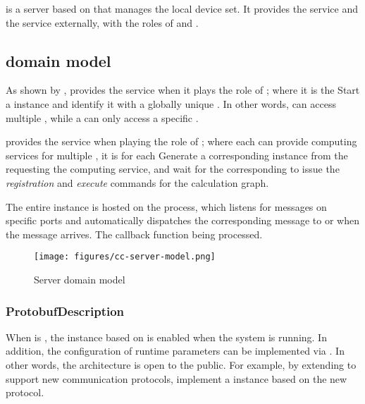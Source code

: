 \begin{content}

 is a server based on  that manages the local device set. It provides the  service and the  service externally, with the roles of  and .

\subsection{domain model}

As shown by ,  provides the  service when it plays the role of ; where it is the  Start a  instance and identify it with a globally unique . In other words,  can access multiple , while a  can only access a specific .

 provides the  service when playing the role of ; where each  can provide computing services for multiple , it is for each Generate a corresponding  instance from the  requesting the computing service, and wait for the corresponding  to issue the \emph{registration} and \emph{execute} commands for the calculation graph.

The entire  instance is hosted on the  process, which listens for messages on specific ports and automatically dispatches the corresponding message to  or  when the message arrives. The callback function being processed.

\begin{figure}[H]
\centering
\texttt{[image: figures/cc-server-model.png]}
\caption{Server domain model}
 \label{fig:cc-server-model}
\end{figure}

\subsubsection{ProtobufDescription}

When  is , the  instance based on  is enabled when the system is running. In addition, the configuration of runtime parameters can be implemented via . In other words, the \tf{} architecture is open to the public. For example, by extending  to support new communication protocols, implement a  instance based on the new protocol.


\end{content}
